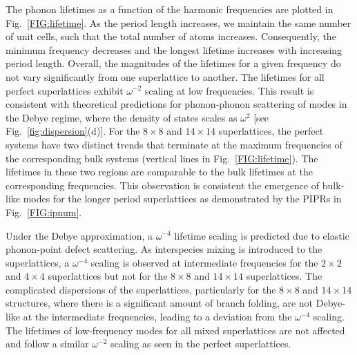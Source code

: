 \documentclass[aps,prb,preprint,preprintnumbers,amsmath,amssymb,floatfix,superscriptaddress]{revtex4}
\newcommand{\kv}{\mspace{-4.0mu}\left(\mspace{-8.0mu}
\begin{smallmatrix}&\pmb{\kappa} \\&\nu\end{smallmatrix}
\mspace{-3.0mu}\right)}
\begin{document}
The phonon lifetimes as a function of the harmonic frequencies are plotted in Fig.~\ref{FIG:lifetime}. As the period length increases, we maintain the same number of unit cells, such that the total number of atoms increases. Consequently, the minimum frequency decreases and the longest lifetime increases with increasing period length. Overall, the magnitudes of the lifetimes for a given frequency do not vary significantly from one superlattice to another. The lifetimes for all perfect superlattices exhibit $\omega^{-2}$ scaling at low frequencies. This result is consistent with theoretical predictions for phonon-phonon scattering of modes in the Debye regime, where the density of states scales as $\omega^{2}$ [see Fig.~\ref{fig:dispersion}(d)].\cite{Klemens_Thermal_1951} For the $8\times8$ and $14\times14$ superlattices, the perfect systems have two distinct trends that terminate at the maximum frequencies of the corresponding bulk systems (vertical lines in Fig.~\ref{FIG:lifetime}). The lifetimes in these two regions are comparable to the bulk lifetimes at the corresponding frequencies. This observation is consistent the emergence of bulk-like modes for the longer period superlattices as demonstrated by the PIPRs in Fig.~\ref{FIG:ipnum}.

Under the Debye approximation, a $\omega^{-4}$ lifetime scaling is predicted due to elastic phonon-point defect scattering.\cite{PhysRev.140.A1812,klemens_scattering_1955-3, klemens_thermal_1957-2} As interspecies mixing is introduced to the superlattices, a $\omega^{-4}$ scaling is observed at intermediate frequencies for the $2\times2$ and $4\times4$ superlattices but not for the $8\times8$ and $14\times14$ superlattices. The complicated dispersions of the superlattices, particularly for the $8\times8$ and $14\times14$ structures, where there is a significant amount of branch folding, are not Debye-like at the intermediate frequencies, leading to a deviation from the $\omega^{-4}$ scaling. The lifetimes of low-frequency modes for all mixed superlattices are not affected and follow a similar $\omega^{-2}$ scaling as seen in the perfect superlattices.
\end{document}
